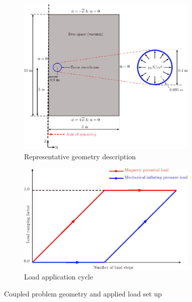 \documentclass[11pt,a4paper,final]{article}
\begin{document}
\begin{figure}[h]
\centering
\begin{subfigure}{0.55\textwidth}
\centering
\includegraphics[width=0.95\textwidth]{coupled_prob_description.pdf}
\caption{Representative geometry description}
\label{fig:3.6.1}
\end{subfigure}
\begin{subfigure}{0.44\textwidth}
\centering
\includegraphics[width=0.95\textwidth]{load_cycle.pdf}
\caption{Load application cycle}
\label{fig:3.6.2}
\end{subfigure}
\caption{Coupled problem geometry and applied load set up}
\label{fig:3.6}
\end{figure}
\end{document}
